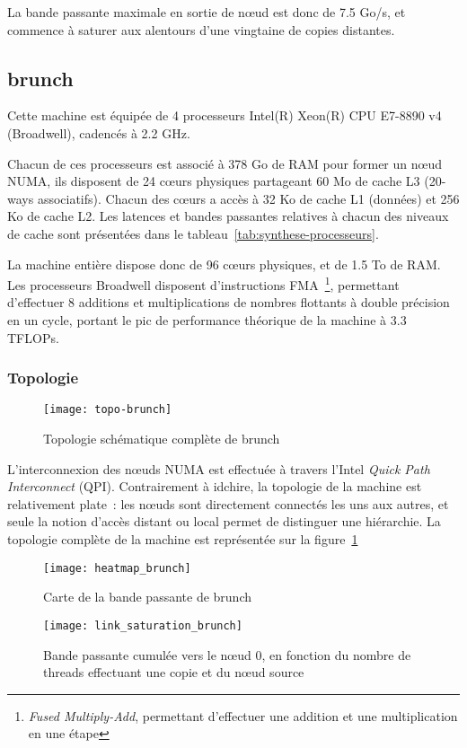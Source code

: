 La bande passante maximale en sortie de nœud est donc de 7.5 Go/s, et commence à saturer aux alentours d'une vingtaine de copies distantes.


\subsection{brunch}\label{sec:contribs:machines:brunch}

Cette machine est équipée de 4 processeurs Intel(R) Xeon(R) CPU E7-8890 v4 (Broadwell), cadencés à 2.2 GHz.

Chacun de ces processeurs est associé à 378 Go de RAM pour former un nœud NUMA, ils disposent de 24 cœurs physiques partageant 60 Mo de cache L3 (20-ways associatifs).
Chacun des cœurs a accès à 32 Ko de cache L1 (données) et 256 Ko de cache L2.
Les latences et bandes passantes relatives à chacun des niveaux de cache sont présentées dans le tableau~\ref{tab:synthese-processeurs}.

La machine entière dispose donc de 96 cœurs physiques, et de 1.5 To de RAM.
Les processeurs Broadwell disposent d'instructions FMA~\footnote{\emph{Fused Multiply-Add}, permettant d'effectuer une addition et une multiplication en une étape}, permettant d'effectuer 8 additions et multiplications de nombres flottants à double précision en un cycle, portant le pic de performance théorique de la machine à 3.3 TFLOPs.


\subsubsection{Topologie}

\begin{figure}[ht]
  \centering
  \texttt{[image: topo-brunch]}
  \caption{Topologie schématique complète de brunch}\label{fig:contribs:machines:brunch:topo-liens}
\end{figure}

L'interconnexion des nœuds NUMA est effectuée à travers l'Intel \emph{Quick Path Interconnect} (QPI).
Contrairement à idchire, la topologie de la machine est relativement plate~: les nœuds sont directement connectés les uns aux autres, et seule la notion d'accès distant ou local permet de distinguer une hiérarchie.
La topologie complète de la machine est représentée sur la figure~\ref{fig:contribs:machines:brunch:topo-liens}

\begin{figure}[t!]
  \centering
  \texttt{[image: heatmap\_brunch]}
  \caption{Carte de la bande passante de brunch}\label{fig:contribs:machines:brunch:heatmap}
\end{figure}
\begin{figure}[h!]
  \centering
  \texttt{[image: link\_saturation\_brunch]}
  \caption{Bande passante cumulée vers le nœud 0, en fonction du nombre de threads effectuant une copie et du nœud source}\label{fig:contribs:machines:brunch:saturation}
\end{figure}


